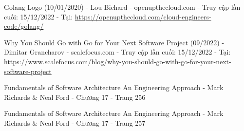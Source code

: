\begin{thebibliography}{9}
    Golang Logo (10/01/2020) - Lou Bichard - openupthecloud.com - Truy cập lần cuối: 15/12/2022 - Tại: \url{https://openupthecloud.com/cloud-engineers-code/golang/}

    Why You Should Go with Go for Your Next Software Project (09/2022) - Dimitar Grancharov - scalefocus.com - Truy cập lần cuối: 15/12/2022 - Tại: \url{https://www.scalefocus.com/blog/why-you-should-go-with-go-for-your-next-software-project}

    Fundamentals of Software Architecture An Engineering Approach - Mark Richards \& Neal Ford - Chương 17 - Trang 256

    Fundamentals of Software Architecture An Engineering Approach - Mark Richards \& Neal Ford - Chương 17 - Trang 257



\end{thebibliography}